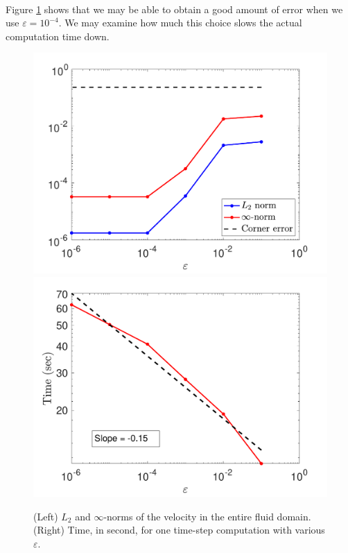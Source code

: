 \\
Figure \ref{fig_errNorms_varEps_NC1} shows that we may be able to obtain a good amount of error when we use $\varepsilon = 10^{-4}$. We may examine how much this choice slows the actual computation time down. 
\begin{figure}[h]
	\begin{center}
		\includegraphics[scale=0.42]{./figures/fig_errNorms_varEps_NC1}
		\includegraphics[scale=0.42]{./figures/fig_times_varEps_NC1}
	\caption{(Left) $L_2$ and $\infty$-norms of the velocity in the entire fluid domain. (Right) Time, in second, for one time-step computation with various $\varepsilon$.}
	\label{fig_errNorms_varEps_NC1}
\end{center}
\end{figure}
\clearpage
